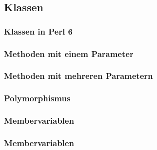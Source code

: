 % 
% 
% 	


\subsection{Klassen}
\begin{frame}
	\frametitle{Klassen in Perl 6}
	
\end{frame}
\begin{frame}
	\frametitle{Methoden mit einem Parameter}
	
\end{frame}
\begin{frame}
	\frametitle{Methoden mit mehreren Parametern}
	
\end{frame}
\begin{frame}
	\frametitle{Polymorphismus}
	
\end{frame}
\begin{frame}
	\frametitle{Membervariablen}
	
\end{frame}
\begin{frame}
	\frametitle{Membervariablen}
	
\end{frame}

